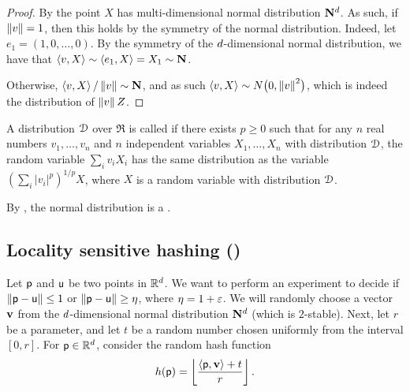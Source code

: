 \begin{proof}
    By  the point $X$ has
    multi-dimensional normal distribution $\mathbf{N}^{d}$.  As
    such, if $\left\| {v} \right\|=1$, then this holds by the symmetry of the
    normal distribution. Indeed, let $e_1 = (1,0, \ldots, 0)$. By the
    symmetry of the $d$-dimensional normal distribution, we have
    that $\left\langle {{v},{ X}} \right\rangle \sim \left\langle {{e_1},{ X}} \right\rangle = X_1 \sim
    \mathbf{N}$.

    Otherwise, $\left\langle {{v},{ X}} \right\rangle /\left\| {v} \right\| \sim \mathbf{N}$, and
    as such $\left\langle {{v},{X}} \right\rangle \sim N\bigl( 0, \left\| {v} \right\|^2 \bigr)$, which
    is indeed the distribution of $\left\| {v} \right\| Z$.
\end{proof}


\begin{defn}
    A distribution $\EuScript{D}$ over $\Re$ is called
     if there exists $p
    \ge 0$ such that for any $n$ real numbers $v_1, \ldots, v_n$ and
    $n$ independent variables $X_1, \ldots, X_n$ with distribution
    $\EuScript{D}$, the random variable $\sum_i v_i X_i$ has the same
    distribution as the variable $(\sum_i |v_i|^p)^{1/p} X$, where $X$
    is a random variable with distribution $\EuScript{D}$.
\end{defn}


By , the normal distribution is a .




\subsection{Locality sensitive hashing (\LSH)}



Let $\mathsf{p}$ and $\mathsf{u}$ be two points in $\mathbb{R}^d$. We want to
perform an experiment to decide if $\left\| {\mathsf{p} -\mathsf{u} } \right\| \leq 1$ or
$\left\| {\mathsf{p} -\mathsf{u} } \right\| \geq \eta$, where $\eta = 1+{\varepsilon}$. We will
randomly choose a vector $\mathbf{v}$ from the $d$-dimensional normal
distribution $\mathbf{N}^{d}$ (which is $2$-stable). Next, let
$r$ be a parameter, and let $t$ be a random number chosen uniformly
from the interval $[0,r]$. For $\mathsf{p} \in \mathbb{R}^d$, consider the
random hash function
\begin{equation}
    h(\pnt) = \floor{ \frac{\DotProd{\pnt}{\vecA} + t}{r}}. 
    \eqlab{L:S:H}
\end{equation}

